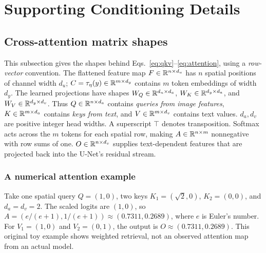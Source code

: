 \pagecut
\section{Supporting Conditioning Details}\label{app:support}
\subsection{Cross-attention matrix shapes}\label{app:attention}
This subsection gives the shapes behind Eqs.~\eqref{eq:qkv}--\eqref{eq:attention},
using a \emph{row-vector} convention. The flattened feature map
$F\in\mathbb{R}^{n\times d_u}$ has $n$ spatial positions of channel width $d_u$;
$C=\tau_\eta(y)\in\mathbb{R}^{m\times d_y}$ contains $m$ token embeddings of
width $d_y$. The learned projections have shapes
$W_Q\in\mathbb{R}^{d_u\times d_a}$,
$W_K\in\mathbb{R}^{d_y\times d_a}$, and
$W_V\in\mathbb{R}^{d_y\times d_v}$.
Thus $Q\in\mathbb{R}^{n\times d_a}$ contains \emph{queries from image features},
$K\in\mathbb{R}^{m\times d_a}$ contains \emph{keys from text}, and
$V\in\mathbb{R}^{m\times d_v}$ contains text values.
$d_a,d_v$ are positive integer head widths. A superscript $\top$ denotes
transposition. Softmax acts across the $m$ tokens for each spatial row,
making $A\in\mathbb{R}^{n\times m}$ nonnegative with row sums of one.
$O\in\mathbb{R}^{n\times d_v}$ supplies text-dependent features that are projected
back into the U-Net's residual stream.



\subsubsection*{A numerical attention example}
Take one spatial query $Q=(1,0)$, two keys
$K_1=(\sqrt2,0)$, $K_2=(0,0)$, and $d_a=d_v=2$.
The scaled logits are $(1,0)$, so
$A=(e/(e+1),1/(e+1))\approx(0.7311,0.2689)$, where $e$ is Euler's number.
For $V_1=(1,0)$ and $V_2=(0,1)$, the output is
$O\approx(0.7311,0.2689)$. This original toy example shows weighted retrieval,
not an observed attention map from an actual model.

